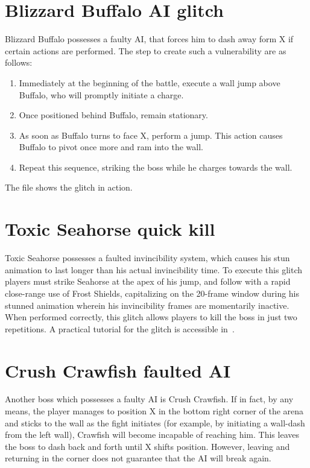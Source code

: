 \section{Blizzard Buffalo AI glitch}\label{glitch:Buffalo_AI}
Blizzard Buffalo possesses a faulty AI, that forces him to dash away form X if certain actions are performed. The step to create such a vulnerability are as follows:
\begin{enumerate}
	\item Immediately at the beginning of the battle, execute a wall jump above Buffalo, who will promptly initiate a charge.
	\item Once positioned behind Buffalo, remain stationary.
	\item As soon as Buffalo turns to face X, perform a jump. This action causes Buffalo to pivot once more and ram into the wall.
	\item Repeat this sequence, striking the boss while he charges towards the wall.
\end{enumerate}

The file  shows the glitch in action.

\section{Toxic Seahorse quick kill}\label{glitch:Sehorse}
Toxic Seahorse possesses a faulted invincibility system, which causes his stun animation to last longer than his actual invincibility time. To execute this glitch players must strike Seahorse at the apex of his jump, and follow with a rapid close-range use of Frost Shields, capitalizing on the 20-frame window during his stunned animation wherein his invincibility frames are momentarily inactive. When performed correctly, this glitch allows players to kill the boss in just two repetitions. A practical tutorial for the glitch is accessible in~\cite{video:seahorse_two_cicle}. 
 
\section{Crush Crawfish faulted AI}\label{glitch:Crawfish_AI}
Another boss which possesses a faulty AI is Crush Crawfish.
If in fact, by any means, the player manages to position X in the bottom right corner of the arena and sticks to the wall as the fight initiates (for example, by initiating a wall-dash from the left wall), Crawfish will become incapable of reaching him. This leaves the boss to dash back and forth until X shifts position. However, leaving and returning in the corner does not guarantee that the AI will break again.

